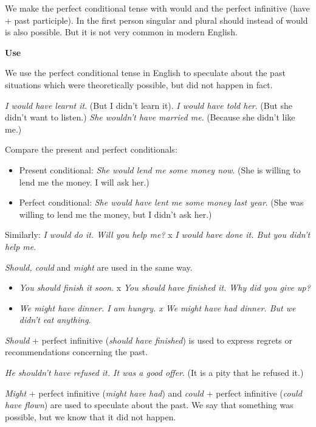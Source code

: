 We make the perfect conditional tense with would and the perfect infinitive (have + past participle). In the first person singular and plural should instead of would is also possible. But it is not very common in modern English.


\textbf{Use}

We use the perfect conditional tense in English to speculate about the past situations which were theoretically possible, but did not happen in fact.  

\textit{I would have learnt it}. (But I didn't learn it). \textit{I would have told her}. (But she didn't want to listen.) \textit{She wouldn't have married me}. (Because she didn't like me.)

Compare the present and perfect conditionals:

\begin{itemize}

\item Present conditional: \textit{She would lend me some money now}. (She is willing to lend me the money. I will ask her.)
\item Perfect conditional: \textit{She would have lent me some money last year}. (She was willing to lend me the money, but I didn't ask her.) 

\end{itemize}

Similarly: \textit{I would do it. Will you help me?} x \textit{I would have done it. But you didn't help me}.

\textit{Should, could} and \textit{might} are used in the same way.

\begin{itemize}
\item \textit{You should finish it soon}. x \textit{You should have finished it. Why did you give up?}
\item \textit{We might have dinner. I am hungry. x We might have had dinner. But we didn't eat anything.}
\end{itemize}

\textit{Should} + perfect infinitive (\textit{should have finished}) is used to express regrets or recommendations concerning the past.

\textit{He shouldn't have refused it. It was a good offer}. (It is a pity that he refused it.)

\textit{Might} + perfect infinitive (\textit{might have had}) and \textit{could} + perfect infinitive (\textit{could have flown}) are used to speculate about the past. We say that something was possible, but we know that it did not happen.

